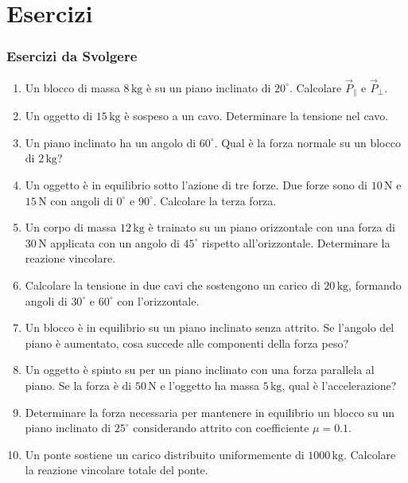 \documentclass{beamer}
\begin{document}
\section{Esercizi}

\begin{frame}
\frametitle{Esercizi da Svolgere}
\begin{enumerate}
    \item Un blocco di massa $8\,\text{kg}$ è su un piano inclinato di $20^\circ$. Calcolare $\vec{P}_\parallel$ e $\vec{P}_\perp$.
    \item Un oggetto di $15\,\text{kg}$ è sospeso a un cavo. Determinare la tensione nel cavo.
    \item Un piano inclinato ha un angolo di $60^\circ$. Qual è la forza normale su un blocco di $2\,\text{kg}$?
    \item Un oggetto è in equilibrio sotto l'azione di tre forze. Due forze sono di $10\,\text{N}$ e $15\,\text{N}$ con angoli di $0^\circ$ e $90^\circ$. Calcolare la terza forza.
    \item Un corpo di massa $12\,\text{kg}$ è trainato su un piano orizzontale con una forza di $30\,\text{N}$ applicata con un angolo di $45^\circ$ rispetto all'orizzontale. Determinare la reazione vincolare.
    \item Calcolare la tensione in due cavi che sostengono un carico di $20\,\text{kg}$, formando angoli di $30^\circ$ e $60^\circ$ con l'orizzontale.
    \item Un blocco è in equilibrio su un piano inclinato senza attrito. Se l'angolo del piano è aumentato, cosa succede alle componenti della forza peso?
    \item Un oggetto è spinto su per un piano inclinato con una forza parallela al piano. Se la forza è di $50\,\text{N}$ e l'oggetto ha massa $5\,\text{kg}$, qual è l'accelerazione?
    \item Determinare la forza necessaria per mantenere in equilibrio un blocco su un piano inclinato di $25^\circ$ considerando attrito con coefficiente $\mu = 0.1$.
    \item Un ponte sostiene un carico distribuito uniformemente di $1000\,\text{kg}$. Calcolare la reazione vincolare totale del ponte.
\end{enumerate}
\end{frame}
\end{document}
